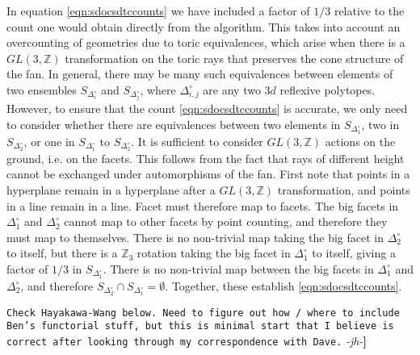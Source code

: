 \documentclass[aps,prl,twocolumn, superscriptaddress,groupedaddress,nofootinbib]{revtex4}
\newcommand{\bZ}{\mathbb{Z}}
\newcommand{\sdoc}{S_{\Delta_1^\circ}}
\newcommand{\sdtc}{S_{\Delta_2^\circ}}
\newcommand{\doc}{{\Delta_1^\circ}}
\newcommand{\dtc}{{\Delta_2^\circ}}
\newcommand{\XXX}[3]{{\color{blue}{\bf [#1: } {\tt #3} {\it -#2-}{\bf ]}}}
\begin{document}
In equation \eqref{eqn:sdocsdtccounts} 
we have included a factor of
$1/3$ relative to the count one would obtain directly from the algorithm.
This takes into account an overcounting of geometries due to toric equivalences,
which arise when there is a $GL(3,\bZ)$ transformation on the toric rays
that preserves the cone structure of the fan. In general, there may
be many such equivalences between elements of two ensembles $S_{\Delta_i^\circ}$
and $S_{\Delta_j^\circ}$, where $\Delta_{i,j}^\circ$ are any two $3d$ reflexive
polytopes. However, to ensure that the count  \eqref{eqn:sdocsdtccounts} is accurate,
we only need to consider whether there are equivalences between
two elements in $\sdoc$, two in $\sdtc$, or one in $\sdoc$ to $\sdtc$. It is sufficient to consider $GL(3,\bZ)$ actions
on the ground, i.e. on the facets. This follows from the fact that rays of different height cannot be exchanged under automorphisms of the fan. First note that points in a hyperplane remain in a
hyperplane after a $GL(3,\bZ)$ transformation, and points
in a line remain in a line. Facet must therefore map to
facets. The big facets in $\doc$ and $\dtc$ cannot map
to other facets by point counting, and therefore they
must map to themselves. There is no non-trivial map
taking the big facet in $\dtc$ to itself, but there is
a $\bZ_3$ rotation taking the big facet in $\doc$ to itself, giving a factor of $1/3$ in $\sdoc$. There is no non-trivial
map between the big facets in $\doc$ and $\dtc$, and therefore
$\sdtc\cap \sdoc  = \emptyset.$ Together, these establish
\eqref{eqn:sdocsdtccounts}.

\XXX{all}{jh}{Check Hayakawa-Wang below. Need to figure out how / where to include
Ben's functorial stuff, but this is minimal start that I believe is correct after
looking through my correspondence with Dave.}
\end{document}
